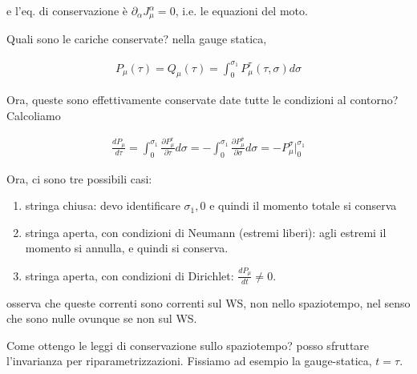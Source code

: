 \documentclass{report}
\begin{document}
e l'eq. di conservazione è \(\partial_\alpha J^\alpha_\mu = 0\), i.e. le equazioni del moto. 

Quali sono le cariche conservate? nella gauge statica, 

\begin{align}
    P_\mu(\tau) = Q_\mu(\tau) = \int_0^{\sigma_1}P_\mu^\tau (\tau, \sigma)d\sigma
\end{align}

Ora, queste sono effettivamente conservate date tutte le condizioni al contorno? Calcoliamo 

\begin{align}
    \frac{dP_\mu}{d\tau} = \int_0^{\sigma_1}\frac{\partial P^\tau_\mu}{\partial \tau}d\sigma = -\int_0^{\sigma_1}\frac{\partial P^\sigma_\mu}{\partial \sigma}d\sigma = -P^\sigma_\mu |^{\sigma_1}_0
\end{align}

Ora, ci sono tre possibili casi: 

\begin{enumerate}
    \item stringa chiusa: devo identificare \(\sigma_1, 0\) e quindi il momento totale si conserva 
    \item stringa aperta, con condizioni di Neumann (estremi liberi): agli estremi il momento si annulla, e quindi si conserva. 
    \item stringa aperta, con condizioni di Dirichlet: \(\frac{dP_\mu}{dt} \neq 0\). 
\end{enumerate}

osserva che queste correnti sono correnti sul WS, non nello spaziotempo, nel senso che sono nulle ovunque se non sul WS. 


Come ottengo le leggi di conservazione sullo spaziotempo? posso sfruttare l'invarianza per riparametrizzazioni. Fissiamo ad esempio la gauge-statica, \(t = \tau\). 

\end{document}
